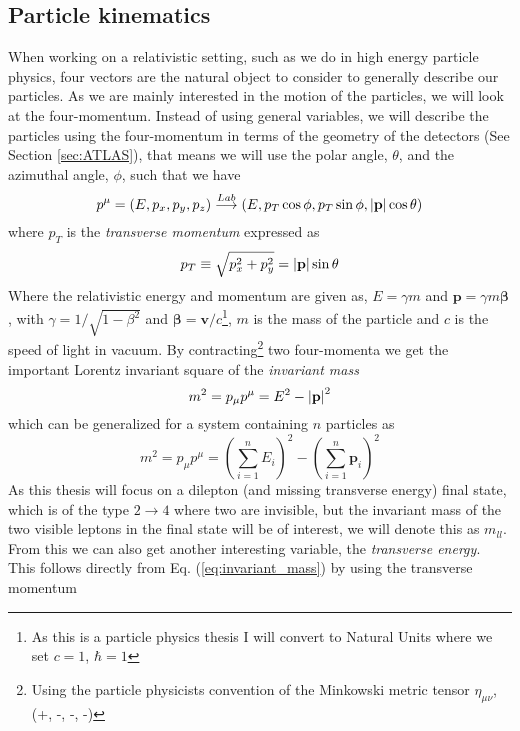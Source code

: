 \documentclass[12pt, a4paper]{book}
\begin{document}
\subsection{Particle kinematics}\label{sec:particle_kinematics}
When working on a relativistic setting, such as we do in high energy particle physics, four vectors are the natural object to consider to generally describe our particles. As we are mainly interested in the motion of the particles, 
we will look at the four-momentum. Instead of using general variables, we will describe the particles using the four-momentum in terms of the geometry of the detectors (See Section \ref{sec:ATLAS}), that means we will use 
the polar angle, $\theta$, and the azimuthal angle, $\phi$, such that we have
\begin{equation}\label{eq:four-momentum}
    p^\mu = (E, p_x, p_y, p_z) \overset{Lab}{\longrightarrow} (E, p_T\cos\phi, p_T\sin\phi, \abs{\mathbf{p}}\cos\theta)
\end{equation}
where $p_T$ is the \textit{transverse momentum} expressed as
\begin{equation}\label{eq:transverse_momentum}
    p_T \equiv\sqrt{p_x^2 +p_y^2} = \abs{\mathbf{p}}\sin\theta
\end{equation}
Where the relativistic energy and momentum are given as, $E=\gamma m$ and $\mathbf{p}=\gamma m\bm\beta$, with $\gamma = 1/\sqrt{1-\beta^2}$ and $\bm\beta = \mathbf{v}/c$\footnote{As this is a particle physics thesis I will convert to Natural Units where we set $c=1$, $\hbar = 1$}, $m$ is the mass of the particle 
and $c$ is the speed of light in vacuum. By contracting\footnote{Using the particle physicists convention of the Minkowski metric tensor $\eta_{\mu\nu}$,  (+, -, -, -)} two four-momenta we get the important Lorentz invariant 
square of the \textit{invariant mass}
$$
    m^2 = p_\mu p^\mu = E^2 - \abs{\mathbf{p}}^2 
$$
which can be generalized for a system containing $n$ particles as
\begin{equation}\label{eq:invariant_mass}
    m^2 = p_\mu p^\mu = \left(\sum_{i=1}^n E_i\right)^2 - \left(\sum_{i=1}^n\mathbf{p}_i\right)^2
\end{equation}
As this thesis will focus on a dilepton (and missing transverse energy) final state, which is of the type $2\rightarrow4$ where two are invisible, but the invariant mass of the two visible leptons in the final state will be of interest, 
we will denote this as $m_{ll}$. From this we can also get another interesting variable, the \textit{transverse energy}. This follows directly from Eq. (\ref{eq:invariant_mass}) by using the transverse momentum
\end{document}
